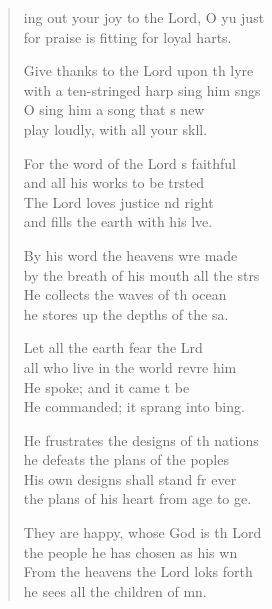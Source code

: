 \settowidth{\versewidth}{Ring out your joy to the Lord, O you just *}
\begin{verse}%
  \begin{patverse}
    ing out your joy to the Lord, O yu just\Med\\
    for praise is fitting for loyal harts.

Give thanks to the Lord upon th lyre\Med\\
    with a ten-stringed harp sing him sngs\\
O sing him a song that \pointup{\i}s new\Med\\
    play loudly, with all your sk\pointup{\i}ll.

For the word of the Lord \pointup{\i}s faithful\Med\\
    and all his works to be trsted\\
The Lord loves justice nd right\Med\\
    and fills the earth with his lve.

By his word the heavens wre made\Med\\
    by the breath of his mouth all the strs\\
He collects the waves of th ocean\Med\\
    he stores up the depths of the sa.

Let all the earth fear the Lrd\Med\\
    all who live in the world revre him\\
He spoke; and it came t be\Med\\
    He commanded; it sprang into bing.

He frustrates the designs of th nations\Med\\
    he defeats the plans of the poples\\
His own designs shall stand fr ever\Med\\
    the plans of his heart from age to ge.

They are happy, whose God is th Lord\Med\\
    the people he has chosen as his wn\\
From the heavens the Lord loks forth\Med\\
    he sees all the children of mn.


\end{patverse}
\end{verse}
